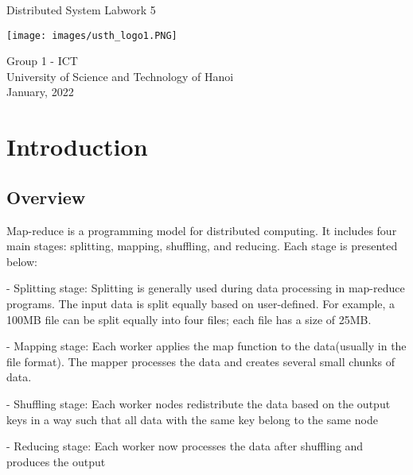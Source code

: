 \documentclass[13pt]{article}
\begin{document}
\begin{titlepage}
    \begin{center}
        \vspace*{1.8cm}
        \Large
        Distributed System Labwork 5\\
        \Large
        \vspace{0.5cm}
        \begin{center}
            \texttt{[image: images/usth\_logo1.PNG]}
        \end{center}  
        \vspace{0.5cm}
            Group 1 - ICT\\
        \vspace{0.5cm}
            University of Science and Technology of Hanoi\\
        \vspace{0.5cm}
            January, 2022
        \vfill
          
   \end{center}
\end{titlepage}

\newpage
\tableofcontents
\newpage


\section{Introduction}
\subsection{Overview}
\noindent%
Map-reduce is a programming model for distributed computing. It includes four main stages: splitting, mapping, shuffling, and reducing. Each stage is presented below:

\noindent%
- Splitting stage: Splitting is generally used during data processing in map-reduce programs. The input data is split equally based on user-defined. For example, a 100MB file can be split equally into four files; each file has a size of 25MB.

\noindent%
- Mapping stage: Each worker applies the map function to the data(usually in the file format). The mapper processes the data and creates several small chunks of data.

\noindent%
- Shuffling stage: Each worker nodes redistribute the data based on the output keys in a way such that all data with the same key belong to the same node

\noindent%
- Reducing stage: Each worker now processes the data after shuffling and produces the output
\end{document}
